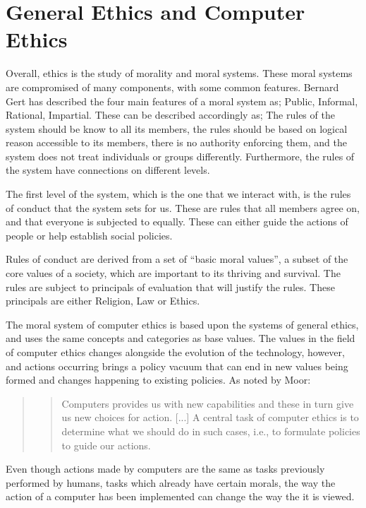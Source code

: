 \chapter{General Ethics and Computer Ethics}

Overall, ethics is the study of morality and moral systems. These moral systems are compromised of many components, with some common features. Bernard Gert has described the four main features of a moral system as; Public, Informal, Rational, Impartial.  These can be described accordingly as; The rules of the system should be know to all its members, the rules should be based on logical reason accessible to its members, there is no authority enforcing them, and the system does not treat individuals or groups differently. Furthermore, the rules of the system have connections on different levels. 

\newpar The first level of the system, which is the one that we interact with, is the rules of conduct that the system sets for us. These are rules that all members agree on, and that everyone is subjected to equally.  These can either guide the actions of people or help establish social policies. 

Rules of conduct are derived from a set of “basic moral values”, a subset of the core values of a society, which are important to its thriving and survival. The rules are subject to principals of evaluation that will justify the rules. These principals are either Religion, Law or Ethics. \cite{tavani2011ethics}

\newpar The moral system of computer ethics is based upon the systems of general ethics, and uses the same concepts and categories as base values. The values in the field of computer ethics changes alongside the evolution of the technology, however, and actions occurring brings a policy vacuum that can end in new values being formed and changes happening to existing policies. As noted by Moor: 

\begin{quote}
	\blockquote{Computers provides us with new capabilities and these in turn give us new choices for action. [...] A central task of computer ethics is to determine what we should do in such cases, i.e., to formulate policies to guide our actions.}\cite{moor1985computer}
\end{quote}


\noindent Even though actions made by computers are the same as tasks previously performed by humans, tasks which already have certain morals, the way the action of a computer has been implemented can change the way the it is viewed. 

